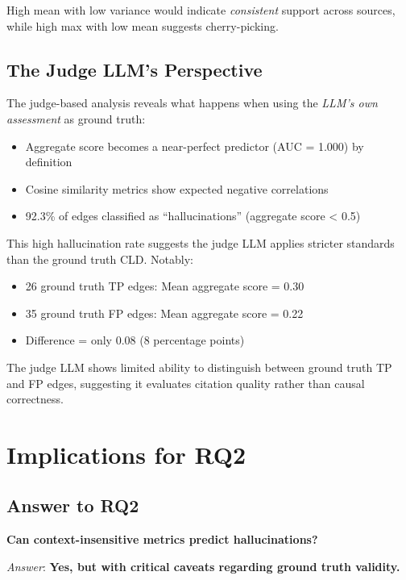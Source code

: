 High mean with low variance would indicate \textit{consistent} support across sources, while high max with low mean suggests cherry-picking.

\subsection{The Judge LLM's Perspective}

The judge-based analysis reveals what happens when using the \textit{LLM's own assessment} as ground truth:

\begin{itemize}
    \item Aggregate score becomes a near-perfect predictor (AUC = 1.000) by definition
    \item Cosine similarity metrics show expected negative correlations
    \item 92.3\% of edges classified as ``hallucinations'' (aggregate score < 0.5)
\end{itemize}

This high hallucination rate suggests the judge LLM applies stricter standards than the ground truth CLD. Notably:

\begin{itemize}
    \item 26 ground truth TP edges: Mean aggregate score = 0.30
    \item 35 ground truth FP edges: Mean aggregate score = 0.22
    \item Difference = only 0.08 (8 percentage points)
\end{itemize}

The judge LLM shows limited ability to distinguish between ground truth TP and FP edges, suggesting it evaluates citation quality rather than causal correctness.

\section{Implications for RQ2}

\subsection{Answer to RQ2}

\textbf{Can context-insensitive metrics predict hallucinations?}

\textit{Answer}: \textbf{Yes, but with critical caveats regarding ground truth validity.}

